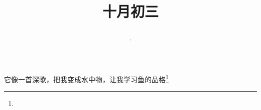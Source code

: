 \title{\date[d=3,m=11,y=2024][year:cn-y,年,month:cn,day:cn,日,·,weekday]·十月初三 }
它像一首深歌，把我变成水中物，让我学习鱼的品格\footnote{ }

